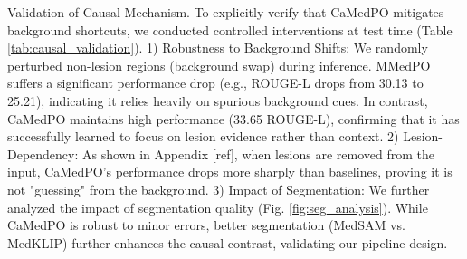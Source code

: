 \begin{table}[t]
\centering
\caption{Validation of Causal Mechanism. We evaluate robustness against distribution shifts (background swap/noise) and verify if the model truly relies on lesion features (composite input consistency). $t$ denotes the model under testing.}
\label{tab:causal_validation}
\vspace{-10pt}
\end{table}

Validation of Causal Mechanism. To explicitly verify that CaMedPO mitigates background shortcuts, we conducted controlled interventions at test time (Table \ref{tab:causal_validation}).
1) Robustness to Background Shifts: We randomly perturbed non-lesion regions (background swap) during inference. MMedPO suffers a significant performance drop (e.g., ROUGE-L drops from 30.13 to 25.21), indicating it relies heavily on spurious background cues. In contrast, CaMedPO maintains high performance (33.65 ROUGE-L), confirming that it has successfully learned to focus on lesion evidence rather than context.
2) Lesion-Dependency: As shown in Appendix [ref], when lesions are removed from the input, CaMedPO's performance drops more sharply than baselines, proving it is not "guessing" from the background.
3) Impact of Segmentation: We further analyzed the impact of segmentation quality (Fig. \ref{fig:seg_analysis}). While CaMedPO is robust to minor errors, better segmentation (MedSAM vs. MedKLIP) further enhances the causal contrast, validating our pipeline design.

